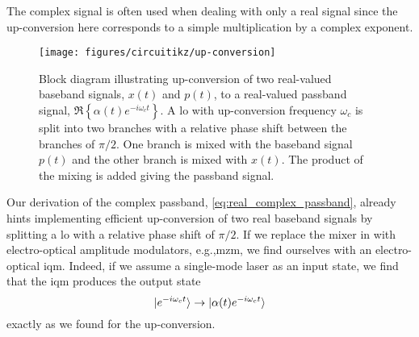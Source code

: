 The complex signal is often used when dealing with only a real signal since the up-conversion here corresponds to a simple multiplication by a complex exponent.
\begin{figure}[htb]
	\centering
	\texttt{[image: figures/circuitikz/up-conversion]}
	\caption{Block diagram illustrating up-conversion of two real-valued baseband signals, $x(t)$ and $p(t)$, to a real-valued passband signal, $\Re\left\{\alpha(t)e^{-i\omega_ct}\right\}$. A \gls{lo} with up-conversion frequency $\omega_c$ is split into two branches with a relative phase shift between the branches of $\pi/2$. One branch is mixed with the baseband signal $p(t)$ and the other branch is mixed with $x(t)$. The product of the mixing is added giving the passband signal.}\label{fig:up_conversion}
\end{figure}
Our derivation of the complex passband, \cref{eq:real_complex_passband}, already hints implementing efficient up-conversion of two real baseband signals by splitting a \gls{lo} with a relative phase shift of $\pi/2$.
If we replace the mixer in  with electro-optical amplitude modulators, e.g.,\gls{mzm}, we find ourselves with an electro-optical \gls{iqm}.
Indeed, if we assume a single-mode laser as an input state, we find that the \gls{iqm} produces the output state
\begin{equation}
	\lvert e^{-i\omega_c t}\rangle
	\to
	\lvert\alpha(t)e^{-i\omega_c t}\rangle
\end{equation}
exactly as we found for the up-conversion.